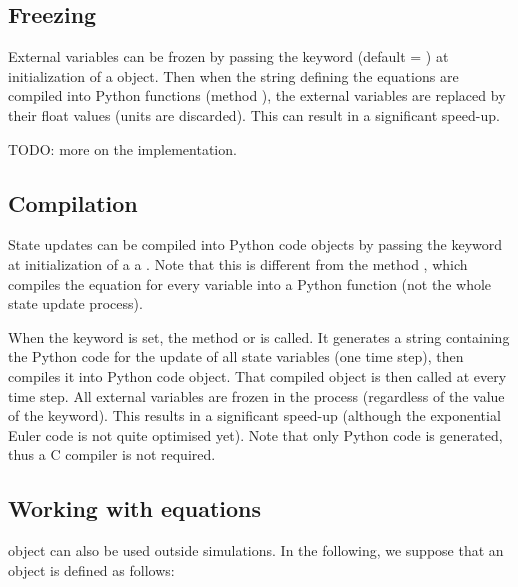 \documentclass[letterpaper,10pt,english]{manual}
\begin{document}
\subsection{Freezing}

External variables can be frozen by passing the keyword 
(default = ) at initialization of a \hyperlink{brian.NeuronGroup}{} object.
Then when the string defining the equations are compiled into Python functions
(method ),
the external variables are replaced by their float values (units are discarded).
This can result in a significant speed-up.

TODO: more on the implementation.

\subsection{Compilation}

State updates can be compiled into Python code objects by passing the keyword
 at initialization of a a \hyperlink{brian.NeuronGroup}{}.
Note that this is different from the method ,
which compiles the equation for every variable into a Python function
(not the whole state update process).

When the  keyword is set, the method 
or  is called. It generates
a string containing the Python code for the update of all state variables (one time step),
then compiles it into Python code object. That compiled object is then called at every time step.
All external variables are frozen in the process (regardless of the value of the  keyword).
This results in a significant speed-up (although the exponential Euler code is not
quite optimised yet). Note that only Python code is generated, thus a
C compiler is not required.


\subsection{Working with equations}

\hyperlink{brian.Equations}{} object can also be used outside simulations.
In the following, we suppose that an \hyperlink{brian.Equations}{} object is defined as follows:
\end{document}
